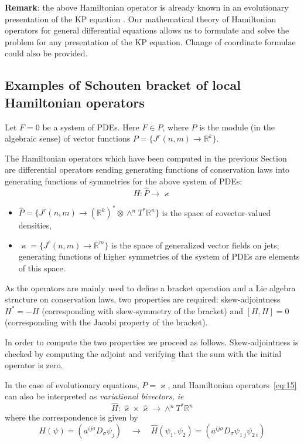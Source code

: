 \textbf{Remark}: the above Hamiltonian operator is already known in an
evolutionary presentation of the KP equation \cite{Kuperschmidt:94}. Our
mathematical theory of Hamiltonian operators for general differential equations
\cite{KerstenKrasilshchikVerbovetskyVitolo:HSGP} allows us to formulate and
solve the problem for any presentation of the KP equation. Change of coordinate
formulae could also be provided.


\subsection{Examples of Schouten bracket of local Hamiltonian
  operators}
\label{cdesec:scho-brack-local}

Let $F=0$ be a system of PDEs. Here $F\in P$, where $P$ is the module (in the
algebraic sense) of vector functions $P=\{J^r(n,m) \to \mathbb{R}^k\}$.

The Hamiltonian operators which have been computed in the previous Section are
differential operators sending generating functions of conservation laws into
generating functions of symmetries for the above system of PDEs:
\begin{equation}
  \label{eq:15}
  H\colon \hat P \to \varkappa
\end{equation}
\begin{itemize}
  \item $\hat P=\{J^r(n,m) \to (\mathbb{R}^k)^*\otimes\wedge^n
    T^*\mathbb{R}^n\}$ is the space of covector-valued densities,
  \item $\varkappa=\{J^r(n,m) \to \mathbb{R}^m\}$ is the space of generalized
    vector fields on jets; generating functions of higher symmetries of the
    system of PDEs are elements of this space.
  \end{itemize}
As the operators are mainly used to define a bracket operation and a Lie
algebra structure on conservation laws, two properties are required:
skew-adjointness $H^* = -H$ (corresponding with skew-symmetry of the bracket)
and $[H,H]=0$ (corresponding with the Jacobi property of the bracket).

In order to compute the two properties we proceed as follows.  Skew-adjointness
is checked by computing the adjoint and verifying that the sum with the initial
operator is zero.

In the case of evolutionary equations, $P=\varkappa$, and Hamiltonian
operators~\eqref{eq:15} can also be interpreted as \emph{variational bivectors,
  ie}
\begin{equation}
  \label{eq:17}
  \hat H\colon \hat\varkappa\times\hat\varkappa \to \wedge^n T^*\mathbb{R}^n
\end{equation}
where the correspondence is given by
\begin{equation}
  \label{eq:18}
  H(\psi) = (a^{ij\sigma}D_\sigma\psi_j)
  \quad \to \quad
    \hat H(\psi_1,\psi_2) = (a^{ij\sigma}D_\sigma\psi_{1\ j}\psi_{2\ i})
\end{equation}

